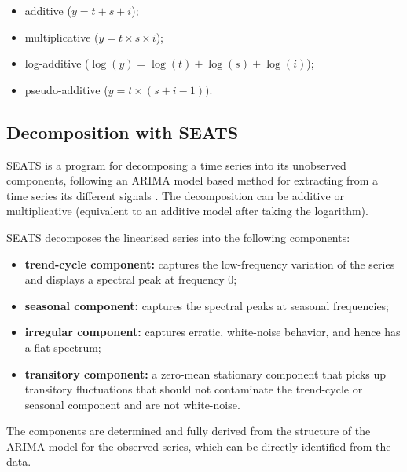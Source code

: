 \documentclass[article]{jss}
\providecommand{\tightlist}{%
  \setlength{\itemsep}{0pt}\setlength{\parskip}{0pt}}
\begin{document}
\begin{itemize}
\tightlist
\item
  additive (\(y = t + s + i\));\\
\item
  multiplicative (\(y = t \times s \times i\));\\
\item
  log-additive (\(\log(y) = \log(t) + \log(s) + \log(i)\));\\
\item
  pseudo-additive (\(y = t \times (s + i - 1)\)).
\end{itemize}

\hypertarget{sa-seats}{%
\subsection{Decomposition with SEATS}\label{sa-seats}}

SEATS is a program for decomposing a time series into its unobserved
components, following an ARIMA model based method for extracting from a
time series its different signals
\citep{gomez1996programs, caporello2004program}. The decomposition can
be additive or multiplicative (equivalent to an additive model after
taking the logarithm).

SEATS decomposes the linearised series into the following components:

\begin{itemize}
\tightlist
\item
  \textbf{trend-cycle component:} captures the low-frequency variation
  of the series and displays a spectral peak at frequency 0;\\
\item
  \textbf{seasonal component:} captures the spectral peaks at seasonal
  frequencies;\\
\item
  \textbf{irregular component:} captures erratic, white-noise behavior,
  and hence has a flat spectrum;\\
\item
  \textbf{transitory component:} a zero-mean stationary component that
  picks up transitory fluctuations that should not contaminate the
  trend-cycle or seasonal component and are not white-noise.
\end{itemize}

The components are determined and fully derived from the structure of
the ARIMA model for the observed series, which can be directly
identified from the data.
\end{document}
